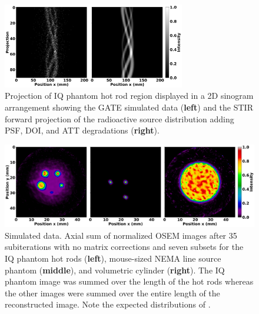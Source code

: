 \documentclass[utf8]{FrontiersinVancouver}
\begin{document}
\begin{figure}[ht!]
\begin{center}
\includegraphics[width=0.71\textwidth]{Figures/HotRod_sinograms_y130}
\end{center}
\caption{Projection of IQ phantom hot rod region displayed in a 2D sinogram arrangement showing the GATE simulated data (\textbf{left}) and the STIR forward projection of the radioactive source distribution adding PSF, DOI, and ATT degradations (\textbf{right}).}
\label{fig:HotRod_sinos}
\end{figure}


\begin{figure}[ht!]
	\begin{center}
		\includegraphics[width=\textwidth]{Figures/OSEM_reconstructions}
	\end{center}
	\caption{Simulated data. Axial sum of normalized OSEM images after 35 subiterations with no matrix corrections and seven subsets for the IQ phantom hot rods (\textbf{left}), mouse-sized NEMA line source phantom (\textbf{middle}), and volumetric cylinder (\textbf{right}). The IQ phantom image was summed over the length of the hot rods whereas the other images were summed over the entire length of the reconstructed image. Note the expected distributions of .}
	\label{fig:reconstructions}
\end{figure}
\end{document}
